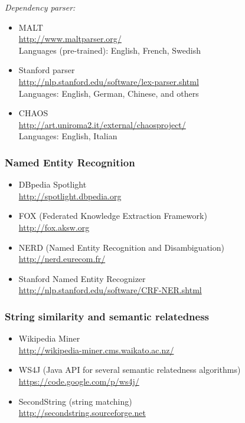 \emph{Dependency parser:}

\begin{itemize}
\item MALT \\
      \url{http://www.maltparser.org/} \\
      Languages (pre-trained): English, French, Swedish 
\item Stanford parser \\ 
      \url{http://nlp.stanford.edu/software/lex-parser.shtml} \\ 
      Languages: English, German, Chinese, and others
\item CHAOS \\
      \url{http://art.uniroma2.it/external/chaosproject/} \\
      Languages: English, Italian
\end{itemize}      

\subsubsection*{Named Entity Recognition}

\begin{itemize}
\item DBpedia Spotlight \\ 
      \url{http://spotlight.dbpedia.org}
\item FOX (Federated Knowledge Extraction Framework) \\ 
      \url{http://fox.aksw.org}
\item NERD (Named Entity Recognition and Disambiguation) \\
      \url{http://nerd.eurecom.fr/}
\item Stanford Named Entity Recognizer \\
      \url{http://nlp.stanford.edu/software/CRF-NER.shtml}
\end{itemize}

\subsubsection*{String similarity and semantic relatedness}

\begin{itemize}
\item Wikipedia Miner \\
      \url{http://wikipedia-miner.cms.waikato.ac.nz/}
\item WS4J (Java API for several semantic relatedness algorithms) \\
      \url{https://code.google.com/p/ws4j/}
\item SecondString (string matching) \\ 
      \url{http://secondstring.sourceforge.net}
\end{itemize}

